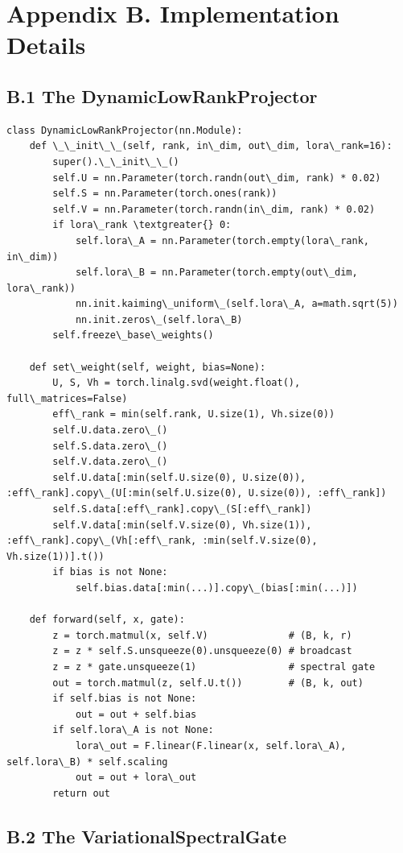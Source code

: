 \section{Appendix B. Implementation Details}

\subsection{B.1 The DynamicLowRankProjector}

\begin{lstlisting}
class DynamicLowRankProjector(nn.Module):
    def \_\_init\_\_(self, rank, in\_dim, out\_dim, lora\_rank=16):
        super().\_\_init\_\_()
        self.U = nn.Parameter(torch.randn(out\_dim, rank) * 0.02)
        self.S = nn.Parameter(torch.ones(rank))
        self.V = nn.Parameter(torch.randn(in\_dim, rank) * 0.02)
        if lora\_rank \textgreater{} 0:
            self.lora\_A = nn.Parameter(torch.empty(lora\_rank, in\_dim))
            self.lora\_B = nn.Parameter(torch.empty(out\_dim, lora\_rank))
            nn.init.kaiming\_uniform\_(self.lora\_A, a=math.sqrt(5))
            nn.init.zeros\_(self.lora\_B)
        self.freeze\_base\_weights()
    
    def set\_weight(self, weight, bias=None):
        U, S, Vh = torch.linalg.svd(weight.float(), full\_matrices=False)
        eff\_rank = min(self.rank, U.size(1), Vh.size(0))
        self.U.data.zero\_()
        self.S.data.zero\_()
        self.V.data.zero\_()
        self.U.data[:min(self.U.size(0), U.size(0)), :eff\_rank].copy\_(U[:min(self.U.size(0), U.size(0)), :eff\_rank])
        self.S.data[:eff\_rank].copy\_(S[:eff\_rank])
        self.V.data[:min(self.V.size(0), Vh.size(1)), :eff\_rank].copy\_(Vh[:eff\_rank, :min(self.V.size(0), Vh.size(1))].t())
        if bias is not None:
            self.bias.data[:min(...)].copy\_(bias[:min(...)])
    
    def forward(self, x, gate):
        z = torch.matmul(x, self.V)              # (B, k, r)
        z = z * self.S.unsqueeze(0).unsqueeze(0) # broadcast
        z = z * gate.unsqueeze(1)                # spectral gate
        out = torch.matmul(z, self.U.t())        # (B, k, out)
        if self.bias is not None:
            out = out + self.bias
        if self.lora\_A is not None:
            lora\_out = F.linear(F.linear(x, self.lora\_A), self.lora\_B) * self.scaling
            out = out + lora\_out
        return out
\end{lstlisting}

\subsection{B.2 The VariationalSpectralGate}

